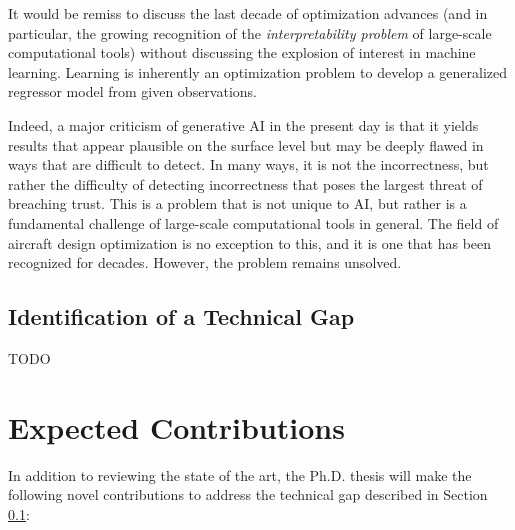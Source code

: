 \documentclass[12pt,vi,twoside]{article}
\begin{document}
    It would be remiss to discuss the last decade of optimization advances (and in particular, the growing recognition of the \textit{interpretability problem} of large-scale computational tools) without discussing the explosion of interest in machine learning. Learning is inherently an optimization problem to develop a generalized regressor model from given observations.

    Indeed, a major criticism of generative AI in the present day is that it yields results that appear plausible on the surface level but may be deeply flawed in ways that are difficult to detect. In many ways, it is not the incorrectness, but rather the difficulty of detecting incorrectness that poses the largest threat of breaching trust. This is a problem that is not unique to AI, but rather is a fundamental challenge of large-scale computational tools in general. The field of aircraft design optimization is no exception to this, and it is one that has been recognized for decades. However, the problem remains unsolved.

    \subsection{Identification of a Technical Gap}
    \label{sec:technical-gap}

    TODO


    \section{Expected Contributions}
    \label{sec:contributions}

    In addition to reviewing the state of the art, the Ph.D. thesis will make the following novel contributions to address the technical gap described in Section \ref{sec:technical-gap}:
\end{document}
